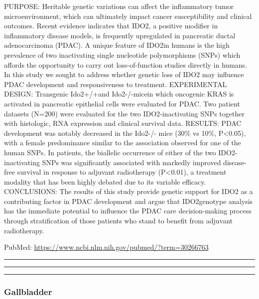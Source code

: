 \documentclass[]{article}
\begin{document}
PURPOSE: Heritable genetic variations can affect the inflammatory tumor
microenvironment, which can ultimately impact cancer susceptibility and
clinical outcomes. Recent evidence indicates that IDO2, a positive
modifier in inflammatory disease models, is frequently upregulated in
pancreatic ductal adenocarcinoma (PDAC). A unique feature of IDO2in
humans is the high prevalence of two inactivating single nucleotide
polymorphisms (SNPs) which affords the opportunity to carry out
loss-of-function studies directly in humans. In this study we sought to
address whether genetic loss of IDO2 may influence PDAC development and
responsiveness to treatment. EXPERIMENTAL DESIGN: Transgenic Ido2+/+and
Ido2-/-micein which oncogenic KRAS is activated in pancreatic epithelial
cells were evaluated for PDAC. Two patient datasets (N=200) were
evaluated for the two IDO2-inactivating SNPs together with histologic,
RNA expression and clinical survival data. RESULTS: PDAC development was
notably decreased in the Ido2-/- mice (30\% vs 10\%, P\textless{}0.05),
with a female predominance similar to the association observed for one
of the human SNPs. In patients, the biallelic occurrence of either of
the two IDO2-inactivating SNPs was significantly associated with
markedly improved disease-free survival in response to adjuvant
radiotherapy (P\textless{}0.01), a treatment modality that has been
highly debated due to its variable efficacy. CONCLUSIONS: The results of
this study provide genetic support for IDO2 as a contributing factor in
PDAC development and argue that IDO2genotype analysis has the immediate
potential to influence the PDAC care decision-making process through
stratification of those patients who stand to benefit from adjuvant
radiotherapy.

PubMed: \url{https://www.ncbi.nlm.nih.gov/pubmed/?term=30266763}

{}

{}

\begin{center}\rule{0.5\linewidth}{\linethickness}\end{center}

\begin{center}\rule{0.5\linewidth}{\linethickness}\end{center}

\begin{center}\rule{0.5\linewidth}{\linethickness}\end{center}

\hypertarget{gallbladder}{%
\subsubsection{Gallbladder}\label{gallbladder}}
\end{document}
